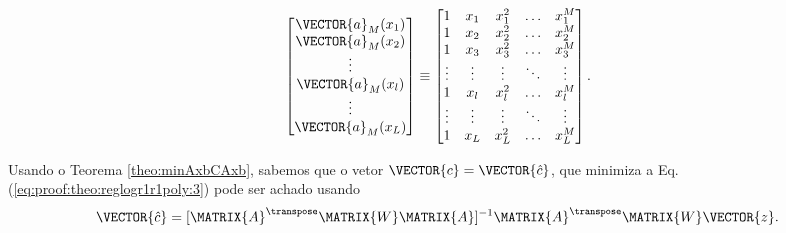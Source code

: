 \begin{myproofT}
\begin{equation}
\begin{bmatrix}
\VECTOR{a}_M(x_1)\\
\VECTOR{a}_M(x_2)\\
\vdots\\
\VECTOR{a}_M(x_l)\\
\vdots\\
\VECTOR{a}_M(x_L)\\
\end{bmatrix}
\equiv 
\begin{bmatrix}
1      & x_1    & x_1^2  & \hdots  & x_1^M  \\
1      & x_2    & x_2^2  & \hdots  & x_2^M  \\
1      & x_3    & x_3^2  & \hdots  & x_3^M  \\
\vdots & \vdots & \vdots & \ddots  & \vdots \\
1      & x_l    & x_l^2  & \hdots  & x_l^M  \\
\vdots & \vdots & \vdots & \ddots  & \vdots \\
1      & x_L    & x_L^2  & \hdots  & x_L^M  \\ 
\end{bmatrix}.
\end{equation}


Usando o Teorema \ref{theo:minAxbCAxb}, sabemos que o vetor $\VECTOR{c}=\VECTOR{\hat{c}}$,
que minimiza a Eq. (\ref{eq:proof:theo:reglogr1r1poly:3}) pode ser achado usando 
\begin{equation}\label{eq:proof:theo:reglogr1r1poly:5}
\VECTOR{\hat{c}}=[\MATRIX{A}^{\transpose}\MATRIX{W}\MATRIX{A}]^{-1}\MATRIX{A}^{\transpose}\MATRIX{W}\VECTOR{z}.
\end{equation}
\end{myproofT}

